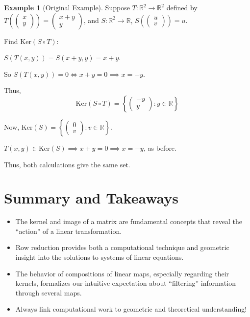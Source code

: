 \documentclass[12pt]{article}
\theoremstyle{definition}
\newtheorem{example}{Example}[section]
\theoremstyle{plain}
\begin{document}
\begin{example}[Original Example]
    Suppose \( T: \mathbb{R}^2 \to \mathbb{R}^2 \) defined by \( T\left( \begin{pmatrix} x \\ y \end{pmatrix} \right) = \begin{pmatrix} x + y \\ y \end{pmatrix} \), and \( S: \mathbb{R}^2 \to \mathbb{R} \), \( S\left( \begin{pmatrix} u \\ v \end{pmatrix} \right) = u \).

    Find \( \mathrm{Ker}(S \circ T) \):

    \( S(T(x,y)) = S(x+y, y) = x+y \).
    
    So \( S(T(x,y)) = 0 \iff x + y = 0 \implies x = -y \).
    
    Thus,
    \[
    \mathrm{Ker}(S \circ T) = \left\{ \begin{pmatrix} -y \\ y \end{pmatrix} : y \in \mathbb{R} \right\}
    \]
    
    Now, \( \mathrm{Ker}(S) = \left\{ \begin{pmatrix} 0 \\ v \end{pmatrix} : v \in \mathbb{R} \right\} \).

    \( T(x,y) \in \mathrm{Ker}(S) \implies x+y=0 \implies x = -y \), as before.

    Thus, both calculations give the same set.
\end{example}

\section*{Summary and Takeaways}

\begin{itemize}
    \item The kernel and image of a matrix are fundamental concepts that reveal the ``action'' of a linear transformation.
    \item Row reduction provides both a computational technique and geometric insight into the solutions to systems of linear equations.
    \item The behavior of compositions of linear maps, especially regarding their kernels, formalizes our intuitive expectation about ``filtering'' information through several maps.
    \item Always link computational work to geometric and theoretical understanding!
\end{itemize}
\end{document}
